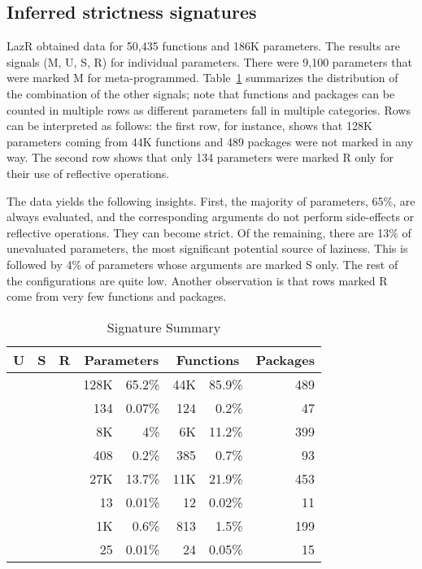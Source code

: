 \documentclass[review,creen,acmsmall]{acmart}
\newcommand{\xmark}{\textcolor{red}{\ding{55}}}
\newcommand{\cmark}{\textcolor{green}{\ding{51}}}
\newcommand{\lazr}{{\sf LazR}\xspace}
\begin{document}
\subsection{Inferred strictness signatures}\label{sec:results}

\lazr obtained data for 50,435 functions and 186K parameters. The results are
signals (M, U, S, R) for individual parameters. There were 9,100 parameters that
were marked M for meta-programmed. Table~\ref{table:strictdist} summarizes the
distribution of the combination of the other signals; note that functions and
packages can be counted in multiple rows as different parameters fall in
multiple categories. Rows can be interpreted as follows: the first row, for
instance, shows that 128K parameters coming from 44K functions and 489 packages
were not marked in any way. The second row shows that only 134 parameters
were marked R only for their use of reflective operations.

The data yields the following insights. First, the majority of parameters, 65\%,
are always evaluated, and the corresponding arguments do not perform
side-effects or reflective operations. They can become strict. Of the remaining,
there are 13\% of unevaluated parameters, the most significant potential source of
laziness. This is followed by 4\% of parameters whose arguments are marked S
only. The rest of the configurations are quite low. Another observation is that
rows marked R come from very few functions and packages.

\begin{table}
  \vspace{-3mm}
  \small
  \caption{Signature Summary} \label{table:strictdist}
  \centering
  \begin{tabular}{cccrrrrr}
    \toprule
    \bf U & \bf S & \bf R & \multicolumn{2}{c}{\textbf{Parameters}} & \multicolumn{2}{c}{\textbf{Functions}}& \bf Packages\\
    \midrule
    \xmark{}&\xmark{}&\xmark{}&128K &65.2\%&44K  &85.9\%&489\\
    \xmark{}&\xmark{}&\cmark{}&134  &0.07\%&124  &0.2\%&47\\
    \xmark{}&\cmark{}&\xmark{}&8K   &4\%&6K      &11.2\%&399\\
    \xmark{}&\cmark{}&\cmark{}&408  &0.2\%&385   &0.7\%&93\\
    \cmark{}&\xmark{}&\xmark{}&27K  &13.7\%&11K  &21.9\%&453\\
    \cmark{}&\xmark{}&\cmark{}&13   &0.01\%&12   &0.02\%&11\\
    \cmark{}&\cmark{}&\xmark{}&1K   &0.6\%&813   &1.5\%&199\\
    \cmark{}&\cmark{}&\cmark{}&25   &0.01\%&24   &0.05\%&15\\
    \bottomrule
  \end{tabular}
\end{table}
\end{document}
